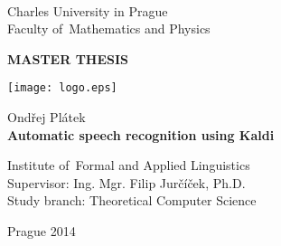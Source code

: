 
\begin{titlepage}
\begin{center}
\ \\

\vspace{15mm}

\large
Charles University in Prague\\
Faculty of~Mathematics and Physics\\

\vspace{5mm}

{\Large\bf MASTER THESIS}

\vspace{15mm}

\texttt{[image: logo.eps]} %

\vspace{20mm}
{\Large Ondřej Plátek}\\ 

\vspace{5mm}
{\Large\bf Automatic speech recognition using Kaldi}

\vspace{20mm}
\large
\noindent
Institute of~Formal and Applied Linguistics\\
\noindent
Supervisor: Ing. Mgr. Filip Jurčíček, Ph.D.\\
\noindent
Study branch: Theoretical Computer Science\\
\end{center}
\vspace{20mm}
\begin{center}
Prague 2014
\end{center}

\end{titlepage} %


\begin{figure}[htp] 
\end{figure}  

\newpage
\begin{figure}[htp] 
\end{figure}  

